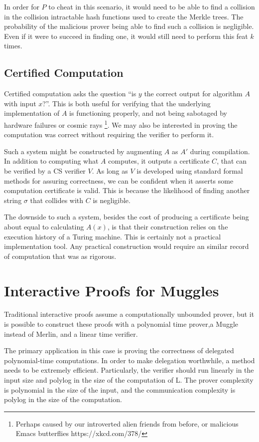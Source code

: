 \documentclass{article}
\begin{document}
In order for $P$ to cheat in this scenario, it would need to be able to find a collision in the collision intractable hash functions used to create the Merkle trees. The probability of the malicious prover being able to find such a collision is negligible. Even if it were to succeed in finding one, it would still need to perform this feat $k$ times.

\subsection {Certified Computation}

Certified computation asks the question ``is $y$
the correct output for algorithm $A$
with input $x$?''.
This is both useful for verifying that the underlying implementation
of $A$
is functioning properly, and not being sabotaged by hardware failures
or cosmic rays \footnote{Perhaps caused by our introverted alien
  friends from before, or malicious Emacs butterflies
  https://xkcd.com/378/}.
We may also be interested in proving the computation was correct without requiring the verifier to perform it.

Such a system might be constructed by augmenting $A$ as $A'$ during compilation. In addition to computing what $A$ computes, it outputs a certificate $C$, that can be verified by a CS verifier $V$. As long as $V$ is developed using standard formal methods for assuring correctness, we can be confident when it asserts some computation certificate is valid. This is because the likelihood of finding another string $\sigma$ that collides with $C$ is negligible.

The downside to such a system, besides the cost of producing a certificate being about equal to calculating $A(x)$, is that their construction relies on the execution history of a Turing machine. This is certainly not a practical implementation tool. Any practical construction would require an similar record of computation that was as rigorous.


\section{Interactive Proofs for Muggles \cite{Goldwasser08}}

Traditional interactive proofs assume a computationally unbounded
prover, but it is possible to construct these proofs with a polynomial
time prover,a Muggle instead of Merlin, and a linear time verifier.

The primary application in this case is proving the correctness of
delegated polynomial-time computations. In order to make delegation
worthwhile, a method needs to be extremely efficient. Particularly,
the verifier should run linearly in the input size and polylog in the
size of the computation of L. The prover complexity is polynomial in
the size of the input, and the communication complexity is polylog in
the size of the computation.
\end{document}
